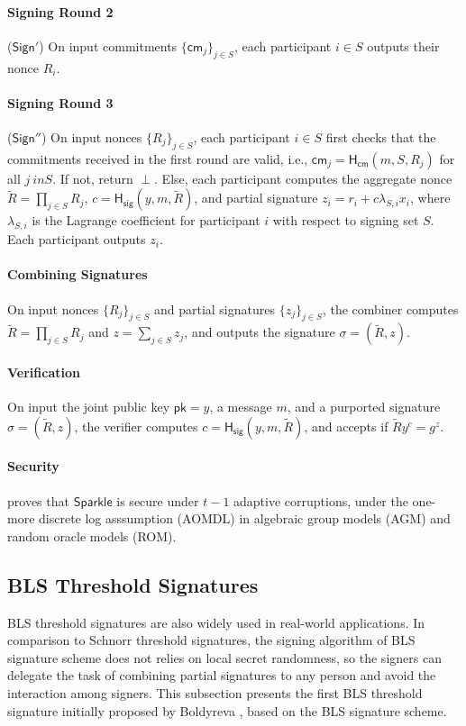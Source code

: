 \paragraph{Signing Round 2} ($\mathsf{Sign'}$) On input commitments $\{\mathsf{cm}_j\}_{j\in S}$, each participant $i\in S$ outputs their nonce $R_i$. 

\paragraph{Signing Round 3} ($\mathsf{Sign''}$) On input nonces $\{R_j\}_{j\in S}$, each participant $i\in S$ first checks that the commitments received in the first round are valid, i.e., $\mathsf{cm}_j=\mathsf{H_{cm}}(m, S, R_j)$ for all $j\ in S$. If not, return $\perp$. Else, each participant computes the aggregate nonce $\tilde{R} = \prod_{j\in S} R_j$, $c=\mathsf{H_{sig}}(y, m, \tilde{R})$, and partial signature $z_i = r_i + c\lambda_{S,i} x_i$, where $\lambda_{S,i}$ is the Lagrange coefficient for participant $i$ with respect to signing set $S$. Each participant outputs $z_i$. 

\paragraph{Combining Signatures} On input nonces $\{R_j\}_{j\in S}$ and partial signatures $\{z_j\}_{j\in S}$, the combiner computes $\tilde{R}=\prod_{j\in S} R_j$ and $z=\sum_{j\in S} z_j$, and outputs the signature $\sigma=(\tilde{R}, z)$. 

\paragraph{Verification} On input the joint public key $\mathsf{pk}=y$, a message $m$, and a purported signature $\sigma=(\tilde{R}, z)$, the verifier computes $c=\mathsf{H_{sig}}(y, m, \tilde{R})$, and accepts if $\tilde{R}y^c=g^z$. 

\paragraph{Security} \cite{DBLP:conf/crypto/CritesKM23} proves that $\mathsf{Sparkle}$ is secure under $t-1$ adaptive corruptions, under the one-more discrete log asssumption (AOMDL) in algebraic group models (AGM) and random oracle models (ROM).  

\subsection{BLS Threshold Signatures}
BLS threshold signatures are also widely used in real-world applications. In comparison to Schnorr threshold signatures, the signing algorithm of BLS signature scheme does not relies on local secret randomness, so the signers can delegate the task of combining partial signatures to any person and avoid the interaction among signers. This subsection presents the first BLS threshold signature initially proposed by Boldyreva \cite{DBLP:conf/pkc/Boldyreva03}, based on the BLS signature scheme. 


